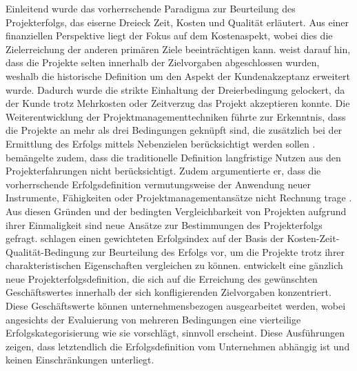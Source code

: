 \newline\newline
Einleitend wurde das vorherrschende Paradigma zur Beurteilung des Projekterfolgs, das eiserne Dreieck Zeit, Kosten und Qualität erläutert. Aus einer finanziellen Perspektive liegt der Fokus auf dem Kostenaspekt, wobei dies die Zielerreichung der anderen primären Ziele beeinträchtigen kann. \citet[S.~40]{kerz14} weist darauf hin, dass die Projekte selten innerhalb der Zielvorgaben abgeschlossen wurden, weshalb die historische Definition um den Aspekt der Kundenakzeptanz erweitert wurde. Dadurch wurde die strikte Einhaltung der Dreierbedingung gelockert, da der Kunde trotz Mehrkosten oder Zeitverzug das Projekt akzeptieren konnte. Die Weiterentwicklung der Projektmanagementtechniken führte zur Erkenntnis, dass die Projekte an mehr als drei Bedingungen geknüpft sind, die zusätzlich bei der Ermittlung des Erfolgs mittels Nebenzielen berücksichtigt werden sollen \citep*[S.~41]{kerz14}. \citet{Atk1999} bemängelte zudem, dass die traditionelle Definition langfristige Nutzen aus den Projekterfahrungen nicht berücksichtigt. Zudem argumentierte er, dass die vorherrschende Erfolgsdefinition vermutungsweise der Anwendung neuer Instrumente, Fähigkeiten oder Projektmanagementansätze nicht Rechnung trage \citep*{Atk1999}. Aus diesen Gründen und der bedingten Vergleichbarkeit von Projekten aufgrund ihrer Einmaligkeit sind neue Ansätze zur Bestimmungen des Projekterfolgs gefragt. \citet{lchch08} schlagen einen gewichteten Erfolgsindex auf der Basis der Kosten-Zeit-Qualität-Bedingung zur Beurteilung des Erfolgs vor, um die Projekte trotz ihrer charakteristischen Eigenschaften vergleichen zu können. \citet{kerz14} entwickelt eine gänzlich neue Projekterfolgsdefinition, die sich auf die Erreichung des gewünschten Geschäftswertes innerhalb der sich konfligierenden Zielvorgaben konzentriert. Diese Geschäftswerte können unternehmensbezogen ausgearbeitet werden, wobei angesichts der Evaluierung von mehreren Bedingungen eine vierteilige Erfolgskategorisierung wie sie \citet[S.~48]{kerz14} vorschlägt, sinnvoll erscheint. Diese Ausführungen zeigen, dass letztendlich die Erfolgsdefinition vom Unternehmen abhängig ist und keinen Einschränkungen unterliegt.
\newline\newline
